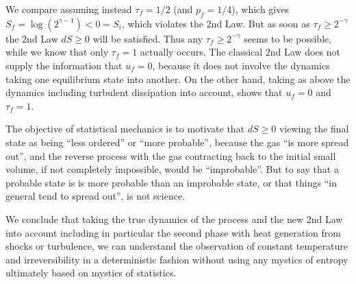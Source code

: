 We compare assuming instead $\tau_f =1/2$ (and $p_f=1/4$), which gives 
$S_f=\log(2^{\gamma -1})<0=S_i$,  which violates the 2nd Law.
But as soon as $\tau_f\ge 2^{-\gamma}$ the 2nd Law $dS\ge 0$ will
be satisfied. Thus any $\tau_f\ge 2^{-\gamma}$
seems to be possible, while we know that only $\tau_f=1$
actually occurs. The classical 2nd Law does not supply the 
information that $u_f=0$, because it does not involve
the dynamics taking one equilibrium state into another.
On the other hand, taking as above the dynamics including turbulent 
dissipation into account, shows that $u_f=0$ and $\tau_f=1$.


The objective of statistical mechanics is to motivate that $dS\ge 0$
viewing the final state as being ``less ordered'' or ``more probable'', 
because the gas ``is more spread out'', 
and the reverse process with the gas contracting back to the 
initial small volume, if not completely impossible, would be 
``improbable''. But to say that a probable
state is is more probable than an improbable state, or
that things ``in general tend to spread out'', is 
not science.

We conclude that taking the 
true dynamics of the process and the new 2nd Law into account including in 
particular the second phase with heat generation from
shocks or turbulence, we can understand the observation 
of constant temperature and irreversibility 
in a deterministic fashion  
without using any mystics of entropy ultimately based on 
mystics of statistics. 





 



